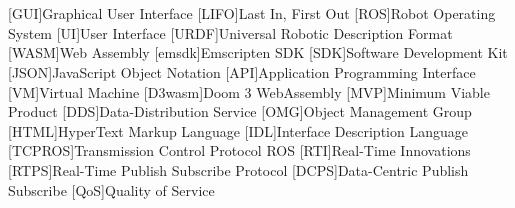 \chapter*{}



\section*{}
\begin{acronym}[LONGEST]

    [GUI]{Graphical User Interface}
    [LIFO]{Last In, First Out}
    [ROS]{Robot Operating System}
    [UI]{User Interface}
    [URDF]{Universal Robotic Description Format}
    [WASM]{Web Assembly}
    [emsdk]{Emscripten SDK}
    [SDK]{Software Development Kit}
    [JSON]{JavaScript Object Notation}
    [API]{Application Programming Interface}
    [VM]{Virtual Machine}
    [D3wasm]{Doom 3 WebAssembly}
    [MVP]{Minimum Viable Product}
    [DDS]{Data-Distribution Service}
    [OMG]{Object Management Group}
    [HTML]{HyperText Markup Language}
    [IDL]{Interface Description Language}
    [TCPROS]{Transmission Control Protocol ROS}
    [RTI]{Real-Time Innovations}
    [RTPS]{Real-Time Publish Subscribe Protocol}
    [DCPS]{Data-Centric Publish Subscribe}
    [QoS]{Quality of Service}

\end{acronym}







